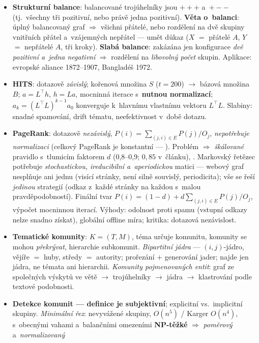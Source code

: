 \documentclass[11pt,a4paper]{article}
\theoremstyle{definition}
\begin{document}
\begin{itemize}
\item \textbf{Strukturní balance}: balancované trojúhelníky jsou $+{+}{+}$ a~$+{-}{-}$
 (tj.\ všechny tři pozitivní, nebo právě jedna pozitivní). \textbf{Věta o~balanci}: úplný
 balancovaný graf $\Rightarrow$ všichni přátelé, nebo rozdělení na dvě skupiny vnitřních
 přátel a~vzájemných nepřátel --- umět důkaz ($X$ $=$ přátelé $A$, $Y$ $=$ nepřátelé
 $A$, tři kroky). \textbf{Slabá balance}: zakázána jen konfigurace \emph{dvě pozitivní
 a~jedna negativní} $\Rightarrow$ rozdělení na \emph{libovolný počet} skupin. Aplikace:
 evropské aliance 1872--1907, Bangladéš 1972.
\item \textbf{HITS}: dotazově \emph{závislý}; kořenová množina $S$ ($t=200$) $\to$ bázová
 množina $B$; $a=L^{\!\top}h$, $h=La$, mocninná iterace s~\textbf{nutnou normalizací};
 $a_k=(L^{\!\top}L)^{k-1}a_0$ konverguje k~hlavnímu vlastnímu vektoru $L^{\!\top}L$.
 Slabiny: snadné spamování, drift tématu, neefektivnost v~době dotazu.
\item \textbf{PageRank}: dotazově \emph{nezávislý}, $P(i)=\sum_{(j,i)\in E}P(j)/O_j$,
 \emph{nepotřebuje normalizaci} (celkový PageRank je konstantní --- ).
 Problém  $\Rightarrow$ \emph{škálované} pravidlo s~tlumicím faktorem
 $d$ (0,8--0,9; $0{,}85$ v~článku), . Markovský řetězec potřebuje
 \emph{stochastickou, ireducibilní a~aperiodickou} matici --- webový graf nesplňuje ani
 jednu (visící stránky, není silně souvislý, periodicita); vše se řeší \emph{jedinou}
 strategií (odkaz z~každé stránky na každou s~malou pravděpodobností). Finální tvar
 $P(i)=(1-d)+d\sum_{(j,i)\in E}P(j)/O_j$, výpočet mocninnou iterací. Výhody: odolnost
 proti spamu (vstupní odkazy nelze snadno získat), globální offline míra; kritika:
 dotazová nezávislost.
\item \textbf{Tematické komunity}: $K=(T,M)$, téma určuje komunitu, komunity se mohou
 \emph{překrývat}, hierarchie subkomunit. \emph{Bipartitní jádra} --- $(i,j)$-jádro,
 vějíře $=$ huby, středy $=$ autority; prořezání $+$ generování jader; najde jen jádra,
 ne témata ani hierarchii. \emph{Komunity pojmenovaných entit}: graf ze společných výskytů
 ve větě $\to$ trojúhelníky $\to$ jádra $\to$ klastrování podle textové podobnosti.
\item \textbf{Detekce komunit --- definice je subjektivní}; explicitní vs.\ implicitní skupiny.
 \emph{Minimální řez}: nevyvážené skupiny, $O(n^5)$ / Karger $O(n^4)$, s~obecnými vahami
 a~balančními omezeními \textbf{NP-těžké} $\Rightarrow$ \emph{poměrový} a~\emph{normalizovaný
}
\end{itemize}
\end{document}
